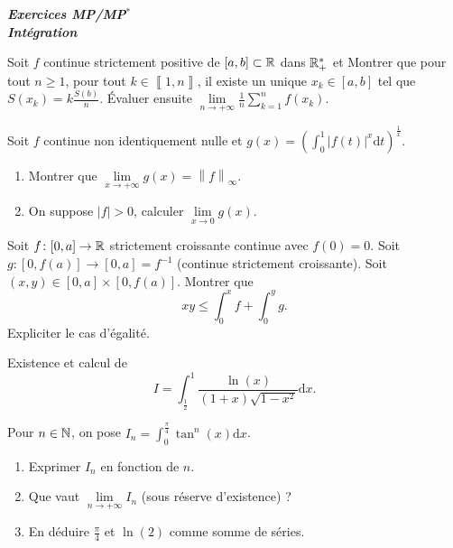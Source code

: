 \documentclass[12pt]{article}
\begin{document}
\begin{titlepage}
	\centering
	\vspace*{\fill}
	\Huge \textit{\textbf{Exercices MP/MP$^*$\\ Intégration}}
	\vspace*{\fill}
\end{titlepage}

\begin{exercise}
    Soit $f$ continue strictement positive de $[a,b]\subset\mathbb{R}$ dans $\mathbb{R}_{+}^{*}$ et 
    Montrer que pour tout $n\geqslant1$, pour tout $k\in\left\llbracket1,n\right\rrbracket$, il existe un unique $x_{k}\in[a,b]$ tel que $S(x_{k})=k\frac{S(b)}{n}$. Évaluer ensuite $\lim\limits_{n\to+\infty}\frac{1}{n}\sum_{k=1}^{n}f(x_{k})$.
\end{exercise}

\begin{exercise}
    Soit $f$ continue non identiquement nulle et $g(x)=\left(\int_{0}^{1}\left\lvert f(t)\right\rvert^{x}\mathrm{d}t\right)^{\frac{1}{x}}$.
    \begin{enumerate}
        \item Montrer que $\lim\limits_{x\to+\infty}g(x)=\left\lVert f\right\rVert_{\infty}$.
        \item On suppose $\left\lvert f\right\rvert>0$, calculer $\lim\limits_{x\to0}g(x)$.
    \end{enumerate}
\end{exercise}

\begin{exercise}
    Soit $f\colon[0,a]\to\mathbb{R}$ strictement croissante continue avec $f(0)=0$. Soit $g\colon[0,f(a)]\to[0,a]=f^{-1}$ (continue strictement croissante). Soit $(x,y)\in[0,a]\times[0,f(a)]$. Montrer que 
    \begin{equation}
        xy\leqslant\int_{0}^{x}f+\int_{0}^{y}g.    
    \end{equation} 
    Expliciter le cas d'égalité.
\end{exercise}

\begin{exercise}
    Existence et calcul de \begin{equation}
        I=\int_{\frac{1}{2}}^{1}\frac{\ln(x)}{(1+x)\sqrt{1-x^{2}}}\mathrm{d}x.
    \end{equation}
\end{exercise}

\begin{exercise}
    Pour $n\in\mathbb{N}$, on pose $I_{n}=\int_{0}^{\frac{\pi}{4}}\tan^{n}(x)\mathrm{d}x$.
    \begin{enumerate}
        \item Exprimer $I_{n}$ en fonction de $n$.
        \item Que vaut $\lim\limits_{n\to+\infty}I_{n}$ (sous réserve d'existence) ?
        \item En déduire $\frac{\pi}{4}$ et $\ln(2)$ comme somme de séries.
    \end{enumerate}
\end{exercise}
\end{document}

